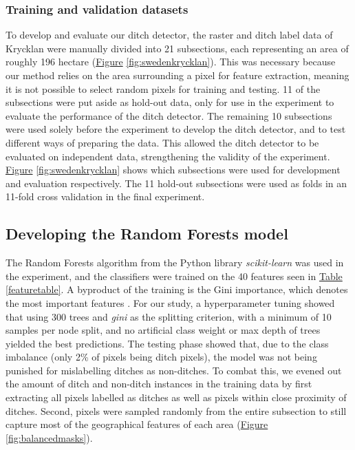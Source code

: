 \documentclass[11pt, review]{elsarticle} %
\begin{document}
\subsubsection{Training and validation datasets}
\label{trainingvalidationdatasets}
To develop and evaluate our ditch detector, the raster and ditch label data of Krycklan were manually divided into 21 subsections, each representing an area of roughly 196 hectare (\hyperref[fig:swedenkrycklan]{Figure} \ref{fig:swedenkrycklan}). This was necessary because our method relies on the area surrounding a pixel for feature extraction, meaning it is not possible to select random pixels for training and testing. 11 of the subsections were put aside as hold-out data, only for use in the experiment to evaluate the performance of the ditch detector. The remaining 10 subsections were used solely before the experiment to develop the ditch detector, and to test different ways of preparing the data. This allowed the ditch detector to be evaluated on independent data, strengthening the validity of the experiment. \hyperref[fig:swedenkrycklan]{Figure} \ref{fig:swedenkrycklan} shows which subsections were used for development and evaluation respectively. The 11 hold-out subsections were used as folds in an 11-fold cross validation in the final experiment.

\subsection{Developing the Random Forests model}

The Random Forests \citep{breiman} algorithm from the Python library \textit{scikit-learn} \citep{scikit-learn} was used in the experiment, and the classifiers were trained on the 40 features seen in \hyperref[featuretable]{Table} \ref{featuretable}. A byproduct of the training is the Gini importance, which denotes the most important features \citep{gini}. For our study, a hyperparameter tuning showed that using 300 trees and \textit{gini} as the splitting criterion, with a minimum of 10 samples per node split, and no artificial class weight or max depth of trees yielded the best predictions. The testing phase showed that, due to the class imbalance (only 2\% of pixels being ditch pixels), the model was not being punished for mislabelling ditches as non-ditches. To combat this, we evened out the amount of ditch and non-ditch instances in the training data by first extracting all pixels labelled as ditches as well as pixels within close proximity of ditches. Second, pixels were sampled randomly from the entire subsection to still capture most of the geographical features of each area (\hyperref[fig:balancedmasks]{Figure} \ref{fig:balancedmasks}).
\end{document}
